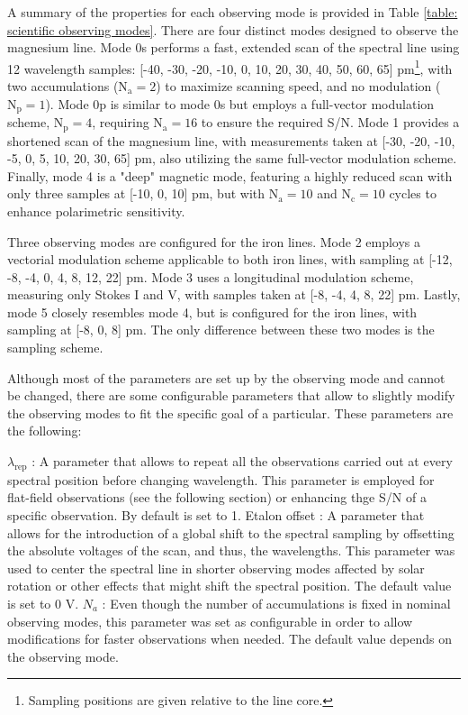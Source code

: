 A summary of the properties for each observing mode is provided in Table \ref{table: scientific observing modes}. There are four distinct modes designed to observe the magnesium line. Mode 0s performs a fast, extended scan of the spectral line using 12 wavelength samples: [-40, -30, -20, -10, 0, 10, 20, 30, 40, 50, 60, 65] pm\footnote{Sampling positions are given relative to the line core.}, with two accumulations ($\text{N}_{\text{a}} = 2$) to maximize scanning speed, and no modulation ($\text{N}_{\text{p}} = 1$). Mode 0p is similar to mode 0s but employs a full-vector modulation scheme, $\text{N}_{\text{p}} = 4$, requiring $\text{N}_{\text{a}} = 16$ to ensure the required S/N. Mode 1 provides a shortened scan of the magnesium line, with measurements taken at [-30, -20, -10, -5, 0, 5, 10, 20, 30, 65] pm, also utilizing the same full-vector modulation scheme. Finally, mode 4 is a "deep" magnetic mode, featuring a highly reduced scan with only three samples at [-10, 0, 10] pm, but with $\text{N}_{\text{a}} = 10$ and $\text{N}_{\text{c}} = 10$ cycles to enhance polarimetric sensitivity. 

Three observing modes are configured for the iron lines. Mode 2 employs a vectorial modulation scheme applicable to both iron lines, with sampling at [-12, -8, -4, 0, 4, 8, 12, 22] pm. Mode 3 uses a longitudinal modulation scheme, measuring only Stokes I and V, with samples taken at [-8, -4, 4, 8, 22] pm. Lastly, mode 5 closely resembles mode 4, but is configured for the iron lines, with sampling at [-8, 0, 8] pm. The only difference between these two modes is the sampling scheme.

Although most of the parameters are set up by the observing mode and cannot be changed, there are some configurable parameters that allow to slightly modify the observing modes to fit the specific goal of a particular. These parameters are the following:

\begin{itemize}
    \Myitem $\lambda _ {\text{rep}}$ : A parameter that allows to repeat all the observations carried out at every spectral position before changing wavelength. This parameter is employed for flat-field observations (see the following section) or enhancing thge S/N of a specific observation. By default is set to 1.
    \Myitem Etalon offset : A parameter that allows for the introduction of a global shift to the spectral sampling by offsetting the absolute voltages of the scan, and thus, the wavelengths. This parameter was used to center the spectral line in shorter observing modes affected by solar rotation or other effects that might shift the spectral position. The default value is set to 0 V.
    \Myitem $N_a$ : Even though the number of accumulations is fixed in nominal observing modes, this parameter was set as configurable in order to allow modifications for faster observations when needed. The  default value depends on the observing mode.  
\end{itemize}



